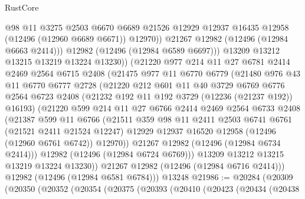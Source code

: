 \begin{lexlean}{RustCore}
\begin{coremodule}
                  @98
                  @11
                  @3275
                  @2503
                  @6670
                  @6689
                  @21526
                  @12929
                  @12937
                  @16435
                  @12958
                  (@12496 (@12960 @6689 @6671))
                  @12970))
              @21267
              @12982
              (@12496 (@12984 @6663 @2414)))
            @12982
            (@12496 (@12984 @6589 @6697)))
          @13209
          @13212
          @13215
          @13219
          @13224
          @13230))
      (@21220
        @977
        @214
        @11
        @27
        @6781
        @2414
        @2469
        @2564
        @6715
        @2408
        (@21475
          @977
          @11
          @6770
          @6779
          (@21480
            @976
            @43
            @11
            @6770
            @6777
            @2728
            (@21220
              @212
              @601
              @11
              @40
              @3729
              @6769
              @6776
              @2564
              @6723
              @2408
              (@21232 @192 @11 @192 @3729 (@12236 (@21237 @192)) @16193)
              (@21220
                @599
                @214
                @11
                @27
                @6766
                @2414
                @2469
                @2564
                @6733
                @2408
                (@21387
                  @599
                  @11
                  @6766
                  (@21511
                    @359
                    @98
                    @11
                    @2411
                    @2503
                    @6741
                    @6761
                    (@21521 @2411 @21524 @12247)
                    @12929
                    @12937
                    @16520
                    @12958
                    (@12496 (@12960 @6761 @6742))
                    @12970))
                @21267
                @12982
                (@12496 (@12984 @6734 @2414)))
              @12982
              (@12496 (@12984 @6724 @6769)))
            @13209
            @13212
            @13215
            @13219
            @13224
            @13230))
        @21267
        @12982
        (@12496 (@12984 @6716 @2414)))
      @12982
      (@12496 (@12984 @6581 @6784)))
    @13248
@21986 := @20284
    (@20309
      (@20350
        (@20352
          (@20354
            (@20375
              (@20393
                (@20410
                  (@20423
                    (@20434
                      (@20438

\end{coremodule}
\end{lexlean}
